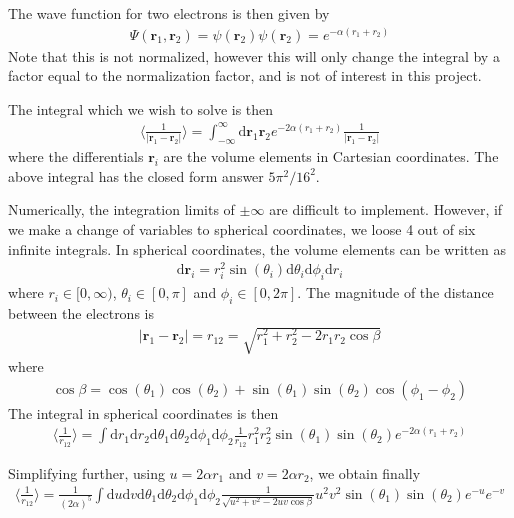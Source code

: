 \documentclass[twoside, 11pt]{article}
\renewcommand{\d}{\mathrm{d}}
\begin{document}
		The wave function for two electrons is then given by
		\begin{align}
			\Psi(\mathbf{r}_1, \mathbf{r}_2) = \psi(\mathbf{r}_2)\psi(\mathbf{r}_2) = e^{-\alpha(r_1 + r_2)}
		\end{align}
		Note that this is not normalized, however this will only change the integral by a factor equal to the normalization factor, and is not of interest in this project.
		
		The integral which we wish to solve is then
		\begin{align}
			\langle \frac{1}{|\mathbf{r}_1 - \mathbf{r}_2|} \rangle = \int_{-\infty}^{\infty} \d\mathbf{r}_1 \mathbf{r}_2 e^{-2\alpha(r_1+r_2)} \frac{1}{|\mathbf{r}_1 - \mathbf{r}_2|} \label{eq: unchanged integral}
		\end{align}
		where the differentials $\mathbf{r}_i$ are the volume elements in Cartesian coordinates. The above integral has the closed form answer $5\pi^2/16^2$.
		
		Numerically, the integration limits of $\pm \infty$ are difficult to implement. However, if we make a change of variables to spherical coordinates, we loose 4 out of six infinite integrals.
		In spherical coordinates, the volume elements can be written as
		\begin{align}
			\d\mathbf{r}_i = r_i^2\sin (\theta_i)\d \theta_i \d \phi_i \d r_i
		\end{align}
		where $r_i \in [0, \infty)$, $\theta_i \in [0, \pi]$ and $\phi_i \in [0, 2\pi]$. The magnitude of the distance between the electrons is 
		\begin{align}
			|\mathbf{r}_1 - \mathbf{r}_2| = r_{12} = \sqrt{r_1^2 + r_2^2 - 2r_1 r_2 \cos \beta}
		\end{align}
		where
		\begin{align}
			\cos\beta = \cos(\theta_1) \cos (\theta_2) + \sin(\theta_1)\sin(\theta_2) \cos(\phi_1 - \phi_2) \nonumber
		\end{align}
		The integral in spherical coordinates is then
		\begin{align}
			\langle \frac{1}{r_{12}} \rangle = \int \d r_1 \d r_2 \d \theta_1 \d \theta_2 \d \phi_1 \d \phi_2 \frac{1}{r_{12}} r_1^2r_2^2\sin(\theta_1)\sin(\theta_2) e^{-2\alpha(r_1+r_2)}
		\end{align}
		
		Simplifying further, using $u = 2\alpha r_1$ and $v = 2\alpha r_2$, we obtain finally
		\begin{align}
			\langle \frac{1}{r_{12}} \rangle = \frac{1}{(2\alpha)^5} \int \d u \d v \d \theta_1 \d \theta_2 \d \phi_1 \d \phi_2 \frac{1}{\sqrt{u^2 + v^2 - 2uv\cos\beta}} u^2v^2\sin(\theta_1)\sin(\theta_2) e^{-u}e^{-v}
		\end{align}
		
\end{document}
